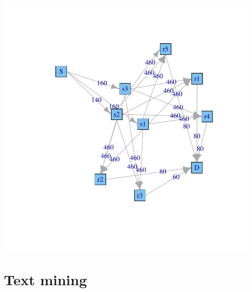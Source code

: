 \documentclass[a4paper,11pt]{scrartcl}
\begin{document}
\includegraphics{r3-046}


\section{Text mining}
\label{sec:textmining}
\end{document}
